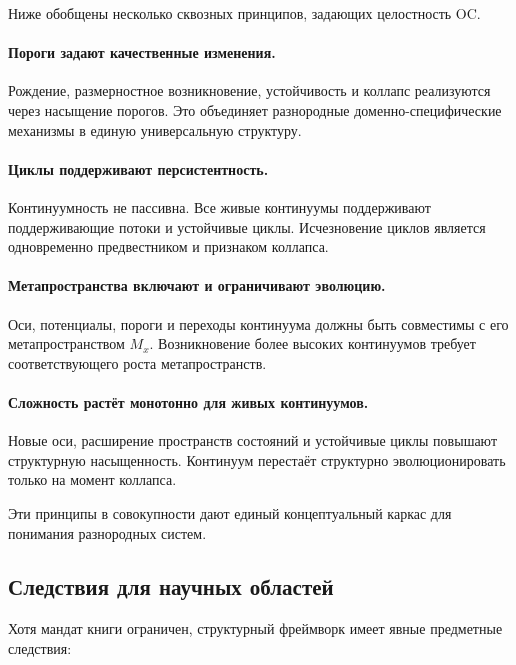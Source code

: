 Ниже обобщены несколько сквозных принципов, задающих целостность OC.

\paragraph{Пороги задают качественные изменения.}
Рождение, размерностное возникновение, устойчивость и коллапс реализуются через
насыщение порогов.
Это объединяет разнородные доменно-специфические механизмы в единую универсальную
структуру.

\paragraph{Циклы поддерживают персистентность.}
Континуумность не пассивна.
Все живые континуумы поддерживают поддерживающие потоки и устойчивые циклы.
Исчезновение циклов является одновременно предвестником и признаком коллапса.

\paragraph{Метапространства включают и ограничивают эволюцию.}
Оси, потенциалы, пороги и переходы континуума должны быть совместимы с
его метапространством \(M_x\).
Возникновение более высоких континуумов требует соответствующего роста метапространств.

\paragraph{Сложность растёт монотонно для живых континуумов.}
Новые оси, расширение пространств состояний и устойчивые циклы повышают
структурную насыщенность.
Континуум перестаёт структурно эволюционировать только на момент коллапса.

Эти принципы в совокупности дают единый концептуальный каркас для понимания
разнородных систем.

\subsection{Следствия для научных областей}

Хотя мандат книги ограничен, структурный фреймворк имеет явные предметные следствия:

